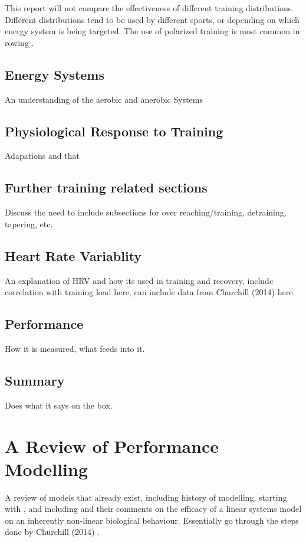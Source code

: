 This report will not compare the effectiveness of different training distributions. Different distributions tend to be used by different sports, or depending on which energy system is being targeted. The use of polarized training is most common in rowing \autocite{Rosenblat2019}.


\subsection{Energy Systems}
An understanding of the aerobic and anerobic Systems

\subsection{Physiological Response to Training}
Adapations and that

\subsection{Further training related sections}
Discuss the need to include subsections for over reaching/training, detraining, tapering, etc.

\subsection{Heart Rate Variablity}
An explanation of HRV and how its used in training and recovery, include correlation with training load here, can include data from Churchill (2014) \autocite{Churchill2014} here.

\subsection{Performance}
How it is measured, what feeds into it.

\subsection{Summary}
Does what it says on the box.

\section{A Review of Performance Modelling}
A review of models that already exist, including history of modelling, starting with \textcite{Bannister1976}, and including \textcite{Edelmannnusser2002} and their comments on the efficacy of a linear systems model on an inherently non-linear biological behaviour. Essentially go through the steps done by Churchill (2014) \autocite{Churchill2014}.

